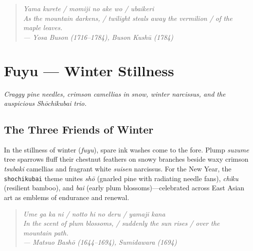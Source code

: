 \documentclass[10pt,a5paper,twoside,openany]{report}
\begin{document}
\begin{quote}
\itshape
Yama kurete / momiji no ake wo / ubaikeri\\[2pt]
As the mountain darkens, / twilight steals away the vermilion / of the maple leaves.\\[2pt]
\upshape\footnotesize --- Yosa Buson (1716--1784), \emph{Buson Kush\=u} (1784)
\end{quote}

\clearpage

\chapter*{Fuyu --- Winter Stillness}
\vspace{2mm}
\noindent\emph{Craggy pine needles, crimson camellias in snow, winter narcissus, and the auspicious Sh\=ochikubai trio.}
\clearpage

\section*{The Three Friends of Winter}

In the stillness of winter (\emph{fuyu}), spare ink washes come to the fore. Plump \emph{suzume} tree sparrows fluff their chestnut feathers on snowy branches beside waxy crimson \emph{tsubaki} camellias and fragrant white \emph{suisen} narcissus. For the New Year, the \texttt{shochikubai} theme unites \emph{sh\=o} (gnarled pine with radiating needle fans), \emph{chiku} (resilient bamboo), and \emph{bai} (early plum blossoms)---celebrated across East Asian art as emblems of endurance and renewal.

\begin{quote}
\itshape
Ume ga ka ni / notto hi no deru / yamaji kana\\[2pt]
In the scent of plum blossoms, / suddenly the sun rises / over the mountain path.\\[2pt]
\upshape\footnotesize --- Matsuo Bash\=o (1644--1694), \emph{Sumidawara} (1694)
\end{quote}
\end{document}
